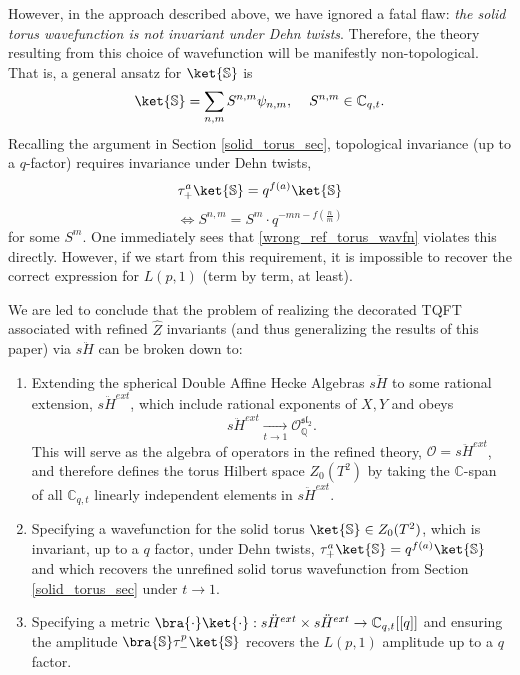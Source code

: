 \documentclass{article}
\def\be{\begin{equation}}
\def\ee{\end{equation}}
\numberwithin{corollary}{theorem}
\numberwithin{corollary}{proposition}
\begin{document}
However, in the approach described above, we have ignored a fatal flaw: \textit{the solid torus wavefunction is not invariant under Dehn twists}. Therefore, the theory resulting from this choice of wavefunction will be manifestly non-topological. That is, a general ansatz for $\ket{\mathbb{S}}$ is
$$\ket{\mathbb{S}} = \sum_{n,m} S^{n,m} \psi_{n,m}, \hspace{4mm} S^{n,m}\in \mathbb{C}_{q,t}.$$
Recalling the argument in Section \ref{solid_torus_sec}, topological invariance (up to a $q$-factor) requires invariance under Dehn twists,
$$\tau_+^a \ket{\mathbb{S}} = q^{f(a)}\ket{\mathbb{S}}$$
\be \label{dehn_twist_invariance} \Leftrightarrow S^{n,m} = S^{m} \cdot q^{-m n-f(\frac{n}{m})} \ee 
for some $S^m$. One immediately sees that \eqref{wrong_ref_torus_wavfn} violates this directly. However, if we start from this requirement, it is impossible to recover the correct expression for $L(p,1)$ (term by term, at least). 

We are led to conclude that the problem of realizing the decorated TQFT associated with refined $\hat{Z}$ invariants (and thus generalizing the results of this paper) via $s\ddot{H}$ can be broken down to:
\begin{enumerate}
    \item Extending the spherical Double Affine Hecke Algebras $s\ddot{H}$ to some rational extension, $s\ddot{H}^{ext}$, which include rational exponents of $X,Y$ and obeys $$s\ddot{H}^{ext} \underset{t\rightarrow1}{\longrightarrow }\mathcal{O}^{\mathfrak{sl}_2}_\mathbb{Q}.$$ This will serve as the algebra of operators in the refined theory, $\mathcal{O} = s\ddot{H}^{ext} $, and therefore defines the torus Hilbert space $Z_0(T^2)$ by taking the $\mathbb{C}$-span of all $\mathbb{C}_{q,t}$ linearly independent elements in $s\ddot{H}^{ext}$.
    \item Specifying a wavefunction for the solid torus $\ket{\mathbb{S}} \in Z_0(T^2)$, which is invariant, up to a $q$ factor, under Dehn twists, $\tau_+^a \ket{\mathbb{S}} = q^{f(a)}\ket{\mathbb{S}}$ and which recovers the unrefined solid torus wavefunction from Section \ref{solid_torus_sec} under $t\rightarrow1$.
    \item Specifying a metric $\bra{\cdot}\ket{\cdot}:s\ddot{H}^{ext}\times s\ddot{H}^{ext} \rightarrow\mathbb{C}_{q,t}[[q]]$ and ensuring the amplitude $\bra{\mathbb{S}}\tau_-^p  \ket{\mathbb{S}}$ recovers the $L(p,1)$ amplitude up to a $q$ factor. 
\end{enumerate}
\end{document}
